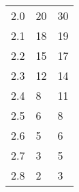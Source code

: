 \begin{table}[H]
{\begin{tabular}{|l|l|l|}
2.0                      & 20                                                                                                                  & 30                                                                                                                 \\
2.1                      & 18                                                                                                                  & 19                                                                                                                 \\
2.2                      & 15                                                                                                                  & 17                                                                                                                 \\
2.3                      & 12                                                                                                                  & 14                                                                                                                 \\
2.4                      & 8                                                                                                                   & 11                                                                                                                 \\
2.5                      & 6                                                                                                                   & 8                                                                                                                  \\
2.6                      & 5                                                                                                                   & 6                                                                                                                  \\
2.7                      & 3                                                                                                                   & 5                                                                                                                  \\
2.8                      & 2                                                                                                                   & 3                                                                                                                  \\

\end{tabular}}
\end{table}
